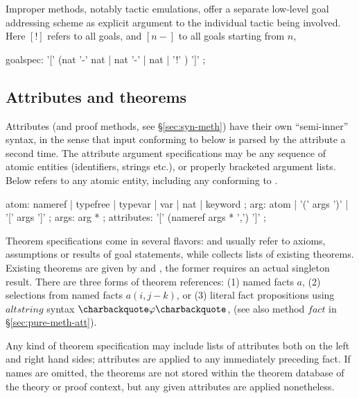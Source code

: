 Improper methods, notably tactic emulations, offer a separate
low-level goal addressing scheme as explicit argument to the
individual tactic being involved.  Here $[!]$ refers to all goals, and
$[n-]$ to all goals starting from $n$,

\begin{rail}
  goalspec: '[' (nat '-' nat | nat '-' | nat | '!' ) ']'
  ;
\end{rail}


\subsection{Attributes and theorems}\label{sec:syn-att}

Attributes (and proof methods, see \S\ref{sec:syn-meth}) have their own
``semi-inner'' syntax, in the sense that input conforming to
 below is parsed by the attribute a second time.  The
attribute argument specifications may be any sequence of atomic entities
(identifiers, strings etc.), or properly bracketed argument lists.  Below
 refers to any atomic entity, including any 
conforming to .

\begin{rail}
  atom: nameref | typefree | typevar | var | nat | keyword
  ;
  arg: atom | '(' args ')' | '[' args ']'
  ;
  args: arg *
  ;
  attributes: '[' (nameref args * ',') ']'
  ;
\end{rail}

Theorem specifications come in several flavors:  and
 usually refer to axioms, assumptions or results of goal
statements, while  collects lists of existing theorems.
Existing theorems are given by  and ,
the former requires an actual singleton result.  There are three forms of
theorem references: (1) named facts $a$, (2) selections from named facts $a(i,
j - k)$, or (3) literal fact propositions using $altstring$ syntax
$\backquote\phi\backquote$, (see also method $fact$ in
\S\ref{sec:pure-meth-att}).

Any kind of theorem specification may include lists of attributes both on the
left and right hand sides; attributes are applied to any immediately preceding
fact.  If names are omitted, the theorems are not stored within the theorem
database of the theory or proof context, but any given attributes are applied
nonetheless.

